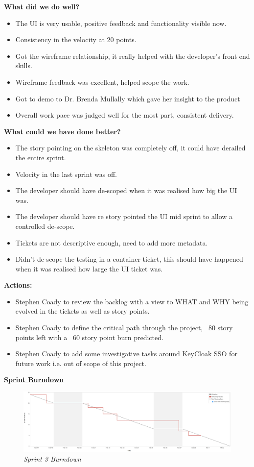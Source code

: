 \textbf{What did we do well?}
\begin{itemize}
	\item The UI is very usable, positive feedback and functionality visible now.
	\item Consistency in the velocity at 20 points.
	\item Got the wireframe relationship, it really helped with the developer's front end skills.
	\item Wireframe feedback was excellent, helped scope the work.
	\item Got to demo to Dr. Brenda Mullally which gave her insight to the product
	\item Overall work pace was judged well for the most part, consistent delivery.
\end{itemize}
\textbf{What could we have done better?}
\begin{itemize}
	\item The story pointing on the skeleton was completely off, it could have derailed the entire sprint.
	\item Velocity in the last sprint was off. 
	\item The developer should have de-scoped when it was realised how big the UI was.
	\item The developer should have re story pointed the UI mid sprint to allow a controlled de-scope.
	\item Tickets are not descriptive enough, need to add more metadata.
	\item Didn't de-scope the testing in a container ticket, this should have happened when it was realised how large the UI ticket was.
\end{itemize}

\textbf{Actions:}
\begin{itemize}
	\item Stephen Coady to review the backlog with a view to WHAT and WHY being evolved in the tickets as well as story points.
	\item Stephen Coady to define the critical path through the project, ~80 story points left with a ~60 story point burn predicted.
	\item Stephen Coady to add some investigative tasks around KeyCloak SSO for future work i.e. out of scope of this project.
\end{itemize}

\underline{\textbf{Sprint Burndown}}\newline
\begin{figure}[!ht]
\centering
\includegraphics*[width=\textwidth]{images/sprint3}
\caption{\em Sprint 3 Burndown}
\label{fig:sprint3}
\end{figure}

